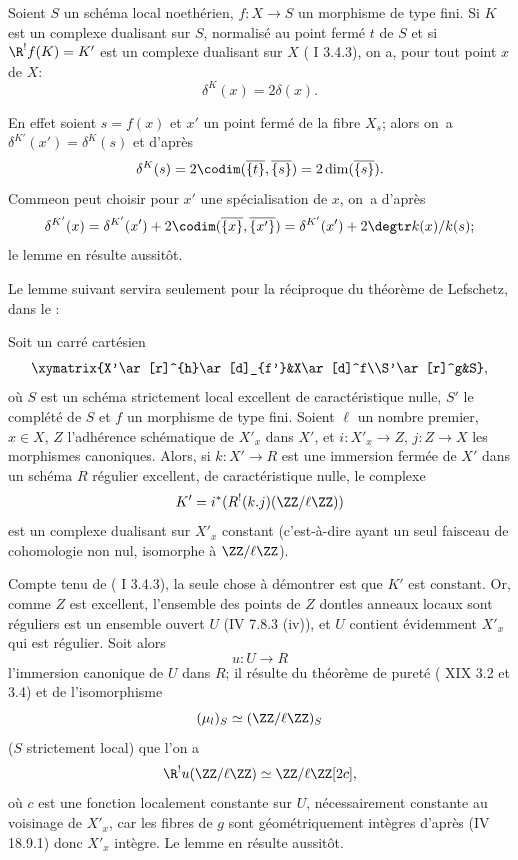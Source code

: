 \begin{sublemme} \label{XIV.2.3.2} Soient $S$ un sch\'ema local noeth\'erien, $f:X\to S$ un morphisme de type fini. Si $K$ est un complexe dualisant sur $S$, normalis\'e au point ferm\'e $t$ de $S$ et si $\R^!f(K)=K'$ est un complexe dualisant sur $X$ (\cf {} I 3.4.3), on a, pour tout point $x$ de $X$:$$
\delta^{K}(x)=2\delta(x).
$$
\end{sublemme}

En effet soient $s=f(x)$ et $x'$ un point ferm\'e de la fibre $X_s$; alors on~a $\delta^{K'}(x')=\delta^K(s)$ et d'apr\`es 
$$
\delta^K(s)=2\codim(\overline{\{t\}}, \overline{\{s\}})=2\dim(\overline{\{s\}}).
$$
Comme\pageoriginaled on peut choisir pour $x'$ une sp\'ecialisation de $x$, on~a d'apr\`es 
$$
\delta^{K'}(x)=\delta^{K'}(x')+2\codim(\overline{\{x\}}, \overline{\{x'\}})=\delta^{K'}(x')+2\degtr k(x)/k(s);$$
le lemme en r\'esulte aussit\^{o}t.

Le lemme suivant servira seulement pour la r\'eciproque du th\'eor\`eme de Lefschetz, dans le \numero{}:

\begin{sublemme} \label{XIV.2.3.3}
Soit un carr\'e cart\'esien
$$
\xymatrix{X'\ar[r]^{h}\ar[d]_{f'}&X\ar[d]^f\\S'\ar[r]^g&S},
$$
o\`u $S$ est un sch\'ema strictement local excellent de caract\'eristique nulle, $S'$ le compl\'et\'e de $S$ et $f$ un morphisme de type fini. Soient $\ell$ un nombre premier, $x\in X$, $Z$ l'adh\'erence sch\'ematique de $X'_x$ dans $X'$, et $i:X'_x\to Z$, $j:Z\to X$ les morphismes canoniques. Alors, si $k:X'\to R$ est une immersion ferm\'ee de $X'$ dans un sch\'ema $R$ r\'egulier excellent, de caract\'eristique nulle, le complexe
$$K'=i^*(R^!(k.j)(\ZZ/\ell\ZZ))$$
est un complexe dualisant sur $X'_x$ constant (c'est-\`a-dire ayant un seul faisceau de cohomologie non nul, isomorphe \`a $\ZZ/\ell\ZZ$).
\end{sublemme}

\enlargethispage{\baselineskip}%
Compte tenu de ( I 3.4.3), la seule chose \`a d\'emontrer est que $K'$ est constant. Or, comme $Z$ est excellent, l'ensemble des points de $Z$ dont\pageoriginale les anneaux locaux sont r\'eguliers est un ensemble ouvert $U$ (\EGA IV 7.8.3 \textup{(iv)}), et $U$ contient \'evidemment $X'_x$ qui est r\'egulier. Soit alors
$$u:U\to R$$
l'immersion canonique de $U$ dans $R$; il r\'esulte du th\'eor\`eme de puret\'e ( XIX 3.2 et 3.4) et de l'isomorphisme
$$(\mu_l)_S\simeq(\ZZ/\ell\ZZ)_S$$
($S$ strictement local) que l'on a
$$
\R^!u(\ZZ/\ell\ZZ)\simeq\ZZ/\ell\ZZ[2c],
$$
o\`u $c$ est une fonction localement constante sur $U$, n\'ecessairement constante au voisinage de $X'_x$, car les fibres de $g$ sont g\'eom\'etriquement int\`egres d'apr\`es (\EGA IV 18.9.1) donc $X'_x$ int\`egre. Le lemme en r\'esulte aussit\^{o}t.

